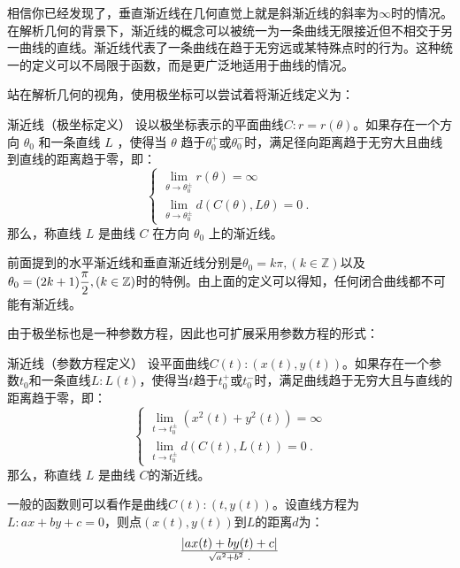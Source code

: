 相信你已经发现了，垂直渐近线在几何直觉上就是斜渐近线的斜率为$\infty$时的情况。在解析几何的背景下，渐近线的概念可以被统一为一条曲线无限接近但不相交于另一曲线的直线。渐近线代表了一条曲线在趋于无穷远或某特殊点时的行为。这种统一的定义可以不局限于函数，而是更广泛地适用于曲线的情况。

站在解析几何的视角，使用极坐标可以尝试着将渐近线定义为：

\begin{definition}{渐近线（极坐标定义）}
设以极坐标表示的平面曲线$C:r=r(\theta)$。如果存在一个方向  $\theta_0$  和一条直线  $L$ ，使得当  $\theta$  趋于$\theta_0^+$或$\theta_0^-$时，满足径向距离趋于无穷大且曲线到直线的距离趋于零，即：
\begin{equation}
\begin{cases}
\displaystyle\lim_{\theta \to \theta^\pm_0} r(\theta) = \infty\\
\displaystyle\lim_{\theta \to \theta^\pm_0} d\left(C(\theta), L\theta\right) = 0~.
\end{cases}
\end{equation}
那么，称直线  $L$  是曲线  $C$  在方向  $\theta_0$  上的渐近线。
\end{definition}

前面提到的水平渐近线和垂直渐近线分别是$\theta_0=k\pi,(k\in\mathbb{Z})$以及$\displaystyle\theta_0=(2k+1){\pi\over2},(k\in\mathbb{Z})$时的特例。由上面的定义可以得知，任何闭合曲线都不可能有渐近线。

由于极坐标也是一种参数方程，因此也可扩展采用参数方程的形式：

\begin{definition}{渐近线（参数方程定义）}\label{def_Asmpto_1}
设平面曲线$C(t):\left(x(t),y(t)\right)$。如果存在一个参数$t_0$和一条直线$L:L(t)$，使得当$t$趋于$t_0^+$或$t_0^-$时，满足曲线趋于无穷大且与直线的距离趋于零，即：
\begin{equation}
\begin{cases}
\displaystyle\lim_{t \to t^\pm_0} \left(x^2(t)+y^2(t)\right) = \infty\\
\displaystyle\lim_{t \to t^\pm_0} d(C(t), L(t)) = 0~.
\end{cases}
\end{equation}
那么，称直线  $L$  是曲线  $C$的渐近线。
\end{definition}

一般的函数则可以看作是曲线$C(t):\left(t,y(t)\right)$。设直线方程为$L:ax+by+c=0$，则点$\left(x(t),y(t)\right)$到$L$的距离$d$为：
\begin{equation}
|ax(t)+by(t)+c|\over\sqrt{a^2+b^2}~.
\end{equation}


